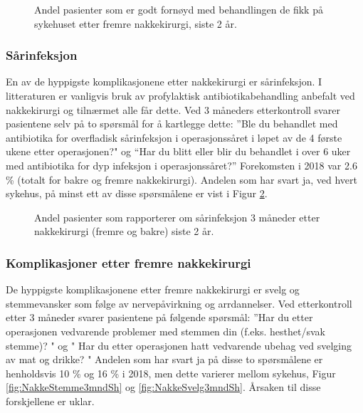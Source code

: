 \documentclass [norsk,a4paper,twoside]{article}\usepackage[]{graphicx}\usepackage[]{color}
\begin{document}
\begin{figure}[ht]
\caption{\label{fig:NakkeFornoydBeh12mndFremSh} Andel pasienter som er godt fornøyd med behandlingen de fikk på sykehuset etter fremre nakkekirurgi, siste 2 år.}
\end{figure}


\clearpage

\subsubsection{Sårinfeksjon }


En av de hyppigste komplikasjonene etter nakkekirurgi er sårinfeksjon. I litteraturen er vanligvis bruk av 
profylaktisk antibiotikabehandling  anbefalt ved nakkekirurgi og tilnærmet alle får dette.
Ved  3 måneders etterkontroll svarer pasientene selv 
på to spørsmål  for å kartlegge dette: ''Ble du behandlet med antibiotika for overfladisk sårinfeksjon 
i operasjonssåret i løpet av de 4 første ukene etter operasjonen?" 
og ``Har du blitt eller blir du behandlet i over 6 uker med antibiotika for dyp infeksjon i operasjonssåret?''  
Forekomsten i 2018 var 2.6 \% (totalt for bakre og fremre nakkekirurgi).  
Andelen som har svart ja, ved hvert sykehus, på minst ett av disse spørsmålene er vist i 
Figur \ref{fig:NakkeKomplinfek3mndSh}.  

\begin{figure}[ht]
\caption{\label{fig:NakkeKomplinfek3mndSh} Andel pasienter som rapporterer om sårinfeksjon 3 måneder etter nakkekirurgi (fremre og bakre) siste 2 år. }
\end{figure}

\clearpage

\subsubsection{Komplikasjoner etter fremre nakkekirurgi}
De hyppigste komplikasjonene etter fremre nakkekirurgi er svelg og stemmevansker som følge 
av nervepåvirkning og arrdannelser. Ved etterkontroll etter 3 måneder svarer pasientene på
følgende spørsmål: ''Har du etter operasjonen vedvarende problemer med stemmen din 
(f.eks. hesthet/svak stemme)? " og " Har du etter operasjonen hatt vedvarende ubehag ved svelging av mat og drikke? "
Andelen som har svart ja på disse to spørsmålene er henholdsvis 10 \% og 16 \% i 2018, men dette  varierer mellom sykehus, Figur \ref{fig:NakkeStemme3mndSh} og \ref{fig:NakkeSvelg3mndSh}. Årsaken til disse forskjellene er uklar. 
\end{document}
